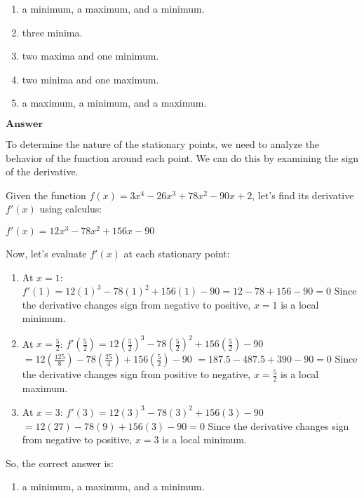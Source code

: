 \documentclass[11pt]{article}
\providecommand{\tightlist}{%
      \setlength{\itemsep}{0pt}\setlength{\parskip}{0pt}}
\begin{document}
\begin{enumerate}
\def\labelenumi{\alph{enumi}.}
\tightlist
\item
  a minimum, a maximum, and a minimum.
\item
  three minima.
\item
  two maxima and one minimum.
\item
  two minima and one maximum.
\item
  a maximum, a minimum, and a maximum.
\end{enumerate}

$\textbf{Answer}$

    To determine the nature of the stationary points, we need to analyze the
behavior of the function around each point. We can do this by examining
the sign of the derivative.

Given the function $ f(x) = 3x^4 - 26x^3 + 78x^2 - 90x + 2 $,
let's find its derivative $ f'(x) $ using calculus:

$ f'(x) = 12x^3 - 78x^2 + 156x - 90 $

Now, let's evaluate $ f'(x) $ at each stationary point:

\begin{enumerate}
\def\labelenumi{\arabic{enumi}.}
\item
  At $ x = 1 $: $ f'(1) = 12(1)^3 - 78(1)^2 + 156(1) - 90 = 12
  - 78 + 156 - 90 = 0 $ Since the derivative changes sign from negative
  to positive, $ x = 1 $ is a local minimum.
\item
  At $ x = \frac{5}{2} $: $ f'\left(\frac{5}{2}\right) =
  12\left(\frac{5}{2}\right)^3 - 78\left(\frac{5}{2}\right)^2 +
  156\left(\frac{5}{2}\right) - 90 $ $ = 12\left(\frac{125}{8}\right)
  - 78\left(\frac{25}{4}\right) + 156\left(\frac{5}{2}\right) - 90 $ $
  = 187.5 - 487.5 + 390 - 90 = 0 $ Since the derivative changes sign
  from positive to negative, $ x = \frac{5}{2} $ is a local maximum.
\item
  At $ x = 3 $: $ f'(3) = 12(3)^3 - 78(3)^2 + 156(3) - 90 $ $
  = 12(27) - 78(9) + 156(3) - 90 = 0 $ Since the derivative changes
  sign from negative to positive, $ x = 3 $ is a local minimum.
\end{enumerate}

So, the correct answer is:

\begin{enumerate}
\def\labelenumi{\alph{enumi}.}
\tightlist
\item
  a minimum, a maximum, and a minimum.
\end{enumerate}
\end{document}
